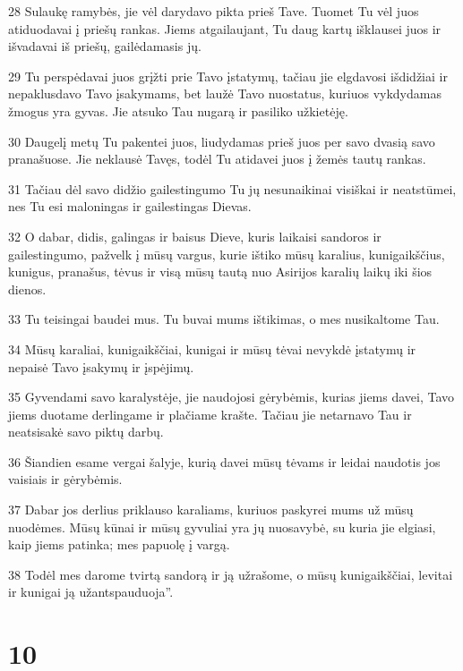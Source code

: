 \par 28 Sulaukę ramybės, jie vėl darydavo pikta prieš Tave. Tuomet Tu vėl juos atiduodavai į priešų rankas. Jiems atgailaujant, Tu daug kartų išklausei juos ir išvadavai iš priešų, gailėdamasis jų. 
\par 29 Tu perspėdavai juos grįžti prie Tavo įstatymų, tačiau jie elgdavosi išdidžiai ir nepaklusdavo Tavo įsakymams, bet laužė Tavo nuostatus, kuriuos vykdydamas žmogus yra gyvas. Jie atsuko Tau nugarą ir pasiliko užkietėję. 
\par 30 Daugelį metų Tu pakentei juos, liudydamas prieš juos per savo dvasią savo pranašuose. Jie neklausė Tavęs, todėl Tu atidavei juos į žemės tautų rankas. 
\par 31 Tačiau dėl savo didžio gailestingumo Tu jų nesunaikinai visiškai ir neatstūmei, nes Tu esi maloningas ir gailestingas Dievas. 
\par 32 O dabar, didis, galingas ir baisus Dieve, kuris laikaisi sandoros ir gailestingumo, pažvelk į mūsų vargus, kurie ištiko mūsų karalius, kunigaikščius, kunigus, pranašus, tėvus ir visą mūsų tautą nuo Asirijos karalių laikų iki šios dienos. 
\par 33 Tu teisingai baudei mus. Tu buvai mums ištikimas, o mes nusikaltome Tau. 
\par 34 Mūsų karaliai, kunigaikščiai, kunigai ir mūsų tėvai nevykdė įstatymų ir nepaisė Tavo įsakymų ir įspėjimų. 
\par 35 Gyvendami savo karalystėje, jie naudojosi gėrybėmis, kurias jiems davei, Tavo jiems duotame derlingame ir plačiame krašte. Tačiau jie netarnavo Tau ir neatsisakė savo piktų darbų. 
\par 36 Šiandien esame vergai šalyje, kurią davei mūsų tėvams ir leidai naudotis jos vaisiais ir gėrybėmis. 
\par 37 Dabar jos derlius priklauso karaliams, kuriuos paskyrei mums už mūsų nuodėmes. Mūsų kūnai ir mūsų gyvuliai yra jų nuosavybė, su kuria jie elgiasi, kaip jiems patinka; mes papuolę į vargą. 
\par 38 Todėl mes darome tvirtą sandorą ir ją užrašome, o mūsų kunigaikščiai, levitai ir kunigai ją užantspauduoja”.



\chapter{10}

